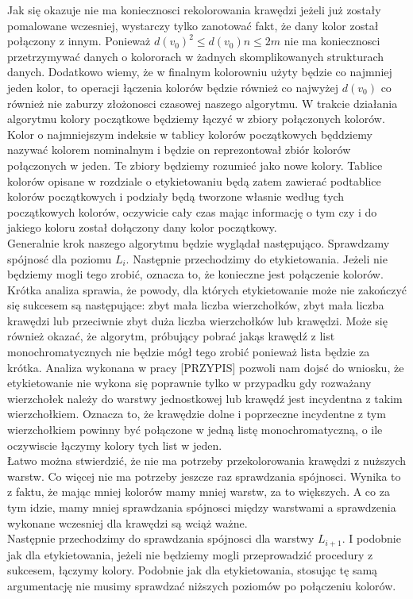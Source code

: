 \documentclass[12pt,a4paper,titlepage]{article}
\begin{document}
Jak się okazuje nie ma koniecznosci rekolorowania krawędzi jeżeli już zostały pomalowane wczesniej, wystarczy tylko zanotować fakt, że dany kolor został połączony z innym. Ponieważ $d(v_0)^2  \leqslant d(v_0)n \leqslant 2m $ nie ma koniecznosci przetrzymywać danych o kolororach w żadnych skomplikowanych strukturach danych. Dodatkowo wiemy, że w finalnym kolorowniu użyty będzie co najmniej jeden kolor, to operacji łączenia kolorów będzie również co najwyżej $d(v_0)$ co również nie zaburzy złożonosci czasowej naszego algorytmu. W trakcie działania algorytmu kolory początkowe będziemy łączyć w zbiory połączonych kolorów. Kolor o najmniejszym indeksie w tablicy kolorów początkowych będdziemy nazywać kolorem nominalnym i będzie on reprezontował zbiór kolorów połączonych w jeden. Te zbiory będziemy rozumieć jako nowe kolory. Tablice kolorów opisane w rozdziale o etykietowaniu będą zatem zawierać podtablice kolorów początkowych i podziały będą tworzone własnie według tych początkowych kolorów, oczywicie cały czas mając informację o tym czy i do jakiego koloru został dołączony dany kolor początkowy.\\
Generalnie krok naszego algorytmu będzie wyglądał następująco. Sprawdzamy spójnosć dla poziomu $L_i$. Następnie przechodzimy do etykietowania. Jeżeli nie będziemy mogli tego zrobić, oznacza to, że konieczne jest połączenie kolorów. Krótka analiza sprawia, że powody, dla których etykietowanie może nie zakończyć się sukcesem są następujące: zbyt mała liczba wierzchołków, zbyt mała liczba krawędzi lub przeciwnie zbyt duża liczba wierzchołków lub krawędzi. Może się również okazać, że algorytm, próbujący pobrać jakąs krawędź z list monochromatycznych nie będzie mógł tego zrobić ponieważ lista będzie za krótka. Analiza wykonana w pracy [PRZYPIS] pozwoli nam dojsć do wniosku, że etykietowanie nie wykona się poprawnie tylko w przypadku gdy rozważany wierzchołek należy do warstwy jednostkowej lub krawędź jest incydentna z takim wierzchołkiem. Oznacza to, że krawędzie dolne i poprzeczne incydentne z tym wierzchołkiem powinny być połączone w jedną listę monochromatyczną, o ile oczywiscie łączymy kolory tych list w jeden. \\
Łatwo można stwierdzić, że nie ma potrzeby przekolorowania krawędzi z nuższych warstw. Co więcej nie ma potrzeby jeszcze raz sprawdzania spójnosci. Wynika to z faktu, że mając mniej kolorów mamy mniej warstw, za to większych. A co za tym idzie, mamy mniej sprawdzania spójnosci między warstwami a sprawdzenia wykonane wczesniej dla krawędzi są wciąż ważne. \\
Następnie przechodzimy do sprawdzania spójnosci dla warstwy $L_{i+1}$. I podobnie jak dla etykietowania, jeżeli nie będziemy mogli przeprowadzić procedury z sukcesem, łączymy kolory. Podobnie jak dla etykietowania, stosując tę samą argumentację nie musimy sprawdzać niższych poziomów po połączeniu kolorów.\\   
\end{document}
